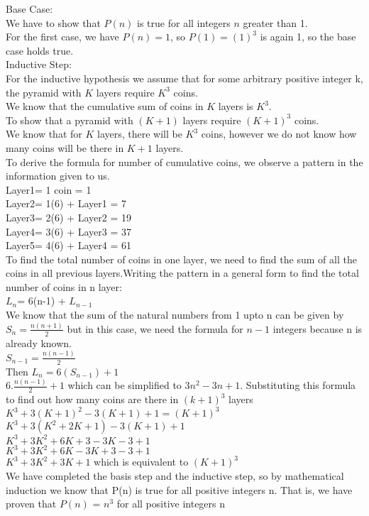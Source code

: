 \documentclass[a4paper]{exam}
\begin{document}
\begin{questions}
\begin{solution}
    Base Case: \\
    We have to show that $P(n)$ is true for all integers $n$ greater than 1.\\
    For the first case, we have $P(n)=1$, so $P(1)=(1)^3$ is again 1, so the base case holds true.\\
    Inductive Step:\\
    For the inductive hypothesis we assume that for some arbitrary positive integer k, the pyramid with $K$ layers require $K^3$ coins.\\
    We know that the cumulative sum of coins in $K$ layers is $K^3$.\\
    To show that a pyramid with $(K+1)$ layers require $(K+1)^3$ coins.\\
    We know that for $K$ layers, there will be $K^3$ coins, however we do not know how many coins will be there in $K+1$ layers.\\
    To derive the formula for number of cumulative coins, we observe a pattern in the information given to us.\\
    Layer1= 1 coin = 1\\
    Layer2= 1(6) + Layer1 = 7\\
    Layer3= 2(6) + Layer2 = 19\\
    Layer4= 3(6) + Layer3 = 37\\
    Layer5= 4(6) + Layer4 = 61\\
    To find the total number of coins in one layer, we need to find the sum of all the coins in all previous layers.Writing the pattern in a general form to find the total number of coins in n layer:\\
    $L_n$= 6(n-1) + $L_{n-1}$\\ 
     We know that the sum of the natural numbers from 1 upto n can be given by $S_n=\frac{n(n+1)}{2}$ but in this case, we need the formula for $n-1$ integers because n is already known.\\
    $S_{n-1} = \frac{n(n-1)}{2}$\\
    Then $L_n = 6(S_{n-1}) +1$\\
    $6.\frac{n(n-1)}{2} + 1$ which can be simplified to $3n^2-3n+1$. Substituting this formula to find out how many coins are there in $(k+1)^3$ layers\\
    $K^3 + 3(K+1)^2 -3(K+1) +1 = (K+1)^3$\\
    $K^3 + 3(K^2 + 2K + 1) - 3(K + 1) + 1$\\
    $K^3 + 3K^2 + 6K + 3 - 3K - 3 + 1$\\
    $K^3 + 3K^2 + 6K - 3K + 3 - 3 + 1$\\
    $K^3 + 3K^2 + 3K + 1$ which is equivalent to $(K+1)^3$\\
    We have completed the basis step and the inductive step, so by mathematical induction we know that P(n) is true for all positive integers n. That is, we have proven that $P(n)$ = $n^3$ for all positive integers n


  \end{solution}


\end{questions}
\end{document}

